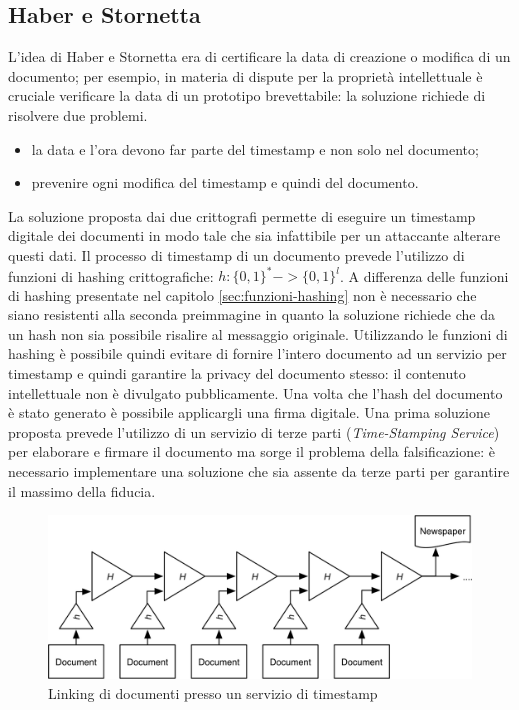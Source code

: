 \subsection{Haber e Stornetta}
L'idea di Haber e Stornetta\cite{haberstornetta} era di certificare la data di creazione o modifica di un documento; per esempio, in materia di dispute per la proprietà intellettuale è cruciale verificare la data di un prototipo brevettabile: la soluzione richiede di risolvere due problemi.
\begin{itemize}
    \item la data e l'ora devono far parte del timestamp e non solo nel documento;
    \item prevenire ogni modifica del timestamp e quindi del documento.
\end{itemize}
La soluzione proposta dai due crittografi permette di eseguire un timestamp digitale dei documenti in modo tale che sia infattibile per un attaccante alterare questi dati.\newline
Il processo di timestamp di un documento prevede l'utilizzo di funzioni di hashing crittografiche: $h: \{0,1\}^* -> \{0,1\}^l$.\newline
A differenza delle funzioni di hashing presentate nel capitolo \ref{sec:funzioni-hashing} non è necessario che siano resistenti alla seconda preimmagine in quanto la soluzione richiede che da un hash non sia possibile risalire al messaggio originale.
Utilizzando le funzioni di hashing è possibile quindi evitare di fornire l'intero documento ad un servizio per timestamp e quindi garantire la privacy del documento stesso: il contenuto intellettuale non è divulgato pubblicamente.\newline
Una volta che l'hash del documento è stato generato è possibile applicargli una firma digitale.\newline
Una prima soluzione proposta prevede l'utilizzo di un servizio di terze parti (\textit{Time-Stamping Service}) per elaborare e firmare il documento ma sorge il problema della falsificazione: è necessario implementare una soluzione che sia assente da terze parti per garantire il massimo della fiducia.
\begin{figure}
    \centering
    \includegraphics[width=\textwidth]{images/haberstornetta.png}
    \caption{Linking di documenti presso un servizio di timestamp}
    \label{fig:haberstornetta}
\end{figure}
